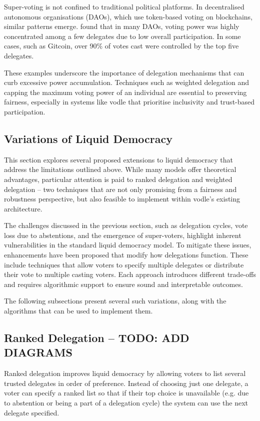 Super-voting is not confined to traditional political platforms. In decentralised autonomous organisations (DAOs), which use token-based voting on blockchains, similar patterns emerge. \citet{hallWhatHappensWhen2024} found that in many DAOs, voting power was highly concentrated among a few delegates due to low overall participation. In some cases, such as Gitcoin, over 90\% of votes cast were controlled by the top five delegates.

These examples underscore the importance of delegation mechanisms that can curb excessive power accumulation. Techniques such as weighted delegation and capping the maximum voting power of an individual are essential to preserving fairness, especially in systems like vodle that prioritise inclusivity and trust-based participation.

\subsection{Variations of Liquid Democracy}
This section explores several proposed extensions to liquid democracy that address the limitations outlined above. While many models offer theoretical advantages, particular attention is paid to ranked delegation and weighted delegation -- two techniques that are not only promising from a fairness and robustness perspective, but also feasible to implement within vodle's existing architecture.

The challenges discussed in the previous section, such as delegation cycles, vote loss due to abstentions, and the emergence of super-voters, highlight inherent vulnerabilities in the standard liquid democracy model. To mitigate these issues, enhancements have been proposed that modify how delegations function. These include techniques that allow voters to specify multiple delegates or distribute their vote to multiple casting voters. Each approach introduces different trade-offs and requires algorithmic support to ensure sound and interpretable outcomes.

The following subsections present several such variations, along with the algorithms that can be used to implement them.
\subsection*{Ranked Delegation -- TODO: ADD DIAGRAMS}
Ranked delegation improves liquid democracy by allowing voters to list several trusted delegates in order of preference. Instead of choosing just one delegate, a voter can specify a ranked list so that if their top choice is unavailable (e.g. due to abstention or being a part of a delegation cycle) the system can use the next delegate specified.

